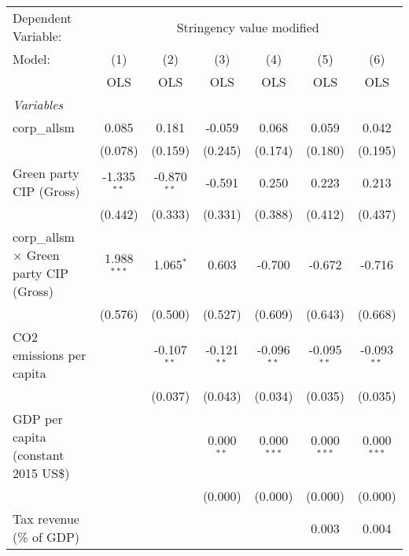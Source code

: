 
\begingroup
\centering
\begin{tabular}{lcccccc}
   \toprule
   Dependent Variable: & \multicolumn{6}{c}{Stringency value modified}\\
   Model:                                         & (1)           & (2)           & (3)           & (4)           & (5)           & (6)\\  
                                                  &  OLS          & OLS           & OLS           & OLS           & OLS           & OLS\\  
   \midrule
   \emph{Variables}\\
   corp\_allsm                                    & 0.085         & 0.181         & -0.059        & 0.068         & 0.059         & 0.042\\   
                                                  & (0.078)       & (0.159)       & (0.245)       & (0.174)       & (0.180)       & (0.195)\\   
   Green party CIP (Gross)                        & -1.335$^{**}$ & -0.870$^{**}$ & -0.591        & 0.250         & 0.223         & 0.213\\   
                                                  & (0.442)       & (0.333)       & (0.331)       & (0.388)       & (0.412)       & (0.437)\\   
   corp\_allsm $\times$ Green party CIP (Gross)   & 1.988$^{***}$ & 1.065$^{*}$   & 0.603         & -0.700        & -0.672        & -0.716\\   
                                                  & (0.576)       & (0.500)       & (0.527)       & (0.609)       & (0.643)       & (0.668)\\   
   CO2 emissions per capita                       &               & -0.107$^{**}$ & -0.121$^{**}$ & -0.096$^{**}$ & -0.095$^{**}$ & -0.093$^{**}$\\   
                                                  &               & (0.037)       & (0.043)       & (0.034)       & (0.035)       & (0.035)\\   
   GDP per capita (constant 2015 US\$)            &               &               & 0.000$^{**}$  & 0.000$^{***}$ & 0.000$^{***}$ & 0.000$^{***}$\\   
                                                  &               &               & (0.000)       & (0.000)       & (0.000)       & (0.000)\\   
   Tax revenue (\% of GDP)                        &               &               &               &               & 0.003         & 0.004\\   

\end{tabular}
